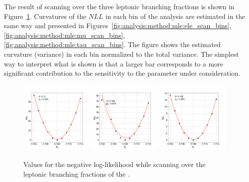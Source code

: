 The result of scanning over the three leptonic branching fractions is shown in Figure~\ref{fig:analysis:method:mle:beta_scan_1D}.  Curvatures of the $NLL$ in each bin of the analysis are estimated in the same way and presented in Figures~\ref{fig:analysis:method:mle:ele_scan_bins}, \ref{fig:analysis:method:mle:mu_scan_bins}, \ref{fig:analysis:method:mle:tau_scan_bins}. The figure shows the estimated curvature (variance) in each bin normalized to the total variance.  The simplest way to interpret what is shown is that a larger bar corresponds to a more significant contribution to the sensitivity to the parameter under consideration.

\begin{figure}[h]
    \centering
    \includegraphics[width=0.32\textwidth]{chapters/Analysis/sectionStatisticalAnalysis/figures/beta_e}
    \includegraphics[width=0.32\textwidth]{chapters/Analysis/sectionStatisticalAnalysis/figures/beta_mu}
    \includegraphics[width=0.32\textwidth]{chapters/Analysis/sectionStatisticalAnalysis/figures/beta_tau}
    \caption{Values for the negative log-likelihood while scanning over the leptonic branching fractions of the \PW.}
    \label{fig:analysis:method:mle:beta_scan_1D}
\end{figure}

